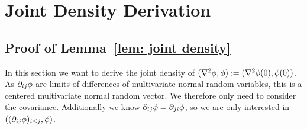 \section{Joint Density Derivation }

\subsection{Proof of Lemma~\ref{lem: joint density}}\label{subsec: joint density derivation}

In this section we want to derive the joint density of \((\nabla^2\phi,\phi):=
(\nabla^2\phi(0), \phi(0))\). As \(\partial_{ij}\phi\) are limits of differences
of multivariate normal random variables, this is a centered multivariate normal
random vector. We therefore only need to consider the covariance. Additionally
we know \(\partial_{ij}\phi = \partial_{ji}\phi\), so we are only interested
in \(((\partial_{ij}\phi)_{i\le j}, \phi)\).


